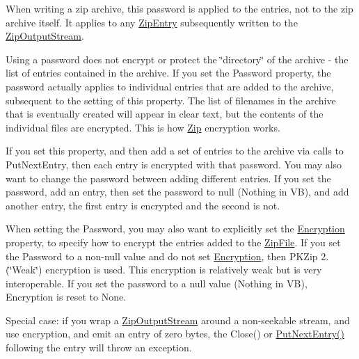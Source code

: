 When writing a zip archive, this password is applied to the entries, not to the zip archive itself. It applies to any {\ttfamily \mbox{\hyperlink{class_super_tiled2_unity_1_1_ionic_1_1_zip_1_1_zip_entry}{Zip\+Entry}}} subsequently written to the {\ttfamily \mbox{\hyperlink{class_super_tiled2_unity_1_1_ionic_1_1_zip_1_1_zip_output_stream}{Zip\+Output\+Stream}}}. 

Using a password does not encrypt or protect the \char`\"{}directory\char`\"{} of the archive -\/ the list of entries contained in the archive. If you set the {\ttfamily Password} property, the password actually applies to individual entries that are added to the archive, subsequent to the setting of this property. The list of filenames in the archive that is eventually created will appear in clear text, but the contents of the individual files are encrypted. This is how \mbox{\hyperlink{namespace_super_tiled2_unity_1_1_ionic_1_1_zip}{Zip}} encryption works. 

If you set this property, and then add a set of entries to the archive via calls to {\ttfamily Put\+Next\+Entry}, then each entry is encrypted with that password. You may also want to change the password between adding different entries. If you set the password, add an entry, then set the password to {\ttfamily null} ({\ttfamily Nothing} in VB), and add another entry, the first entry is encrypted and the second is not. 

When setting the {\ttfamily Password}, you may also want to explicitly set the \mbox{\hyperlink{class_super_tiled2_unity_1_1_ionic_1_1_zip_1_1_zip_output_stream_af1e123174110807666b7c4df62959112}{Encryption}} property, to specify how to encrypt the entries added to the \mbox{\hyperlink{class_super_tiled2_unity_1_1_ionic_1_1_zip_1_1_zip_file}{Zip\+File}}. If you set the {\ttfamily Password} to a non-\/null value and do not set \mbox{\hyperlink{class_super_tiled2_unity_1_1_ionic_1_1_zip_1_1_zip_output_stream_af1e123174110807666b7c4df62959112}{Encryption}}, then P\+K\+Zip 2. (\char`\"{}\+Weak\char`\"{}) encryption is used. This encryption is relatively weak but is very interoperable. If you set the password to a {\ttfamily null} value ({\ttfamily Nothing} in VB), {\ttfamily Encryption} is reset to None. 

Special case\+: if you wrap a \mbox{\hyperlink{class_super_tiled2_unity_1_1_ionic_1_1_zip_1_1_zip_output_stream}{Zip\+Output\+Stream}} around a non-\/seekable stream, and use encryption, and emit an entry of zero bytes, the {\ttfamily Close()} or {\ttfamily \mbox{\hyperlink{class_super_tiled2_unity_1_1_ionic_1_1_zip_1_1_zip_output_stream_a6328a636a423976167278aca779a3eca}{Put\+Next\+Entry()}}} following the entry will throw an exception. \mbox{\label{class_super_tiled2_unity_1_1_ionic_1_1_zip_1_1_zip_output_stream_a0b9d9a664498cd382a763dc674c0c01f}} 
